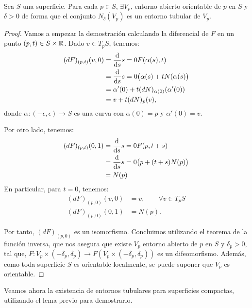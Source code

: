 \begin{lemma}
Sea $S$ una superficie. Para cada $p \in S$, $\exists V_p$, entorno abierto orientable de $p$ en $S$ y $\delta > 0$ de forma que el conjunto $N_\delta(V_p)$ es un entorno tubular de $V_p$.
\end{lemma}
\begin{proof}
Vamos a empezar la demostración calculando la diferencial de $F$ en un punto $(p,t) \in S \times \mathbb{R}$. Dado $v \in T_pS$, tenemos:
%
\begin{align*}
    (dF)_{(p,t)}(v,0) &= \diff{}{s}{s=0} F(\alpha(s), t) \\
    &= \diff{}{s}{s=0} \big( \alpha(s) + tN(\alpha(s) \big) \\ 
    &= \alpha'(0) + t(dN)_{\alpha(0)}(\alpha'(0)) \\ 
    &= v + t(dN)_p(v),
\end{align*}
%
donde $\alpha: (-\epsilon, \epsilon) \longrightarrow S$ es una curva con $\alpha(0) = p$ y $\alpha'(0) = v$. 

Por otro lado, tenemos:
%
\begin{align*}
    (dF)_{(p,t)}(0,1) &= \diff{}{s}{s=0} F(p, t+s) \\ 
    &= \diff{}{s}{s=0} \big( p + (t+s)N(p) \big) \\ &= N(p)
\end{align*}
%
En particular, para $t=0$, tenemos:
%
\begin{align*}
    (dF)_{(p,0)}(v,0) &= v, \qquad \forall v \in T_pS \\
    (dF)_{(p,0)}(0,1) &= N(p).
\end{align*}

Por tanto, $(dF)_{(p,0)}$ es un isomorfismo. Concluimos utilizando el teorema de la función inversa, que nos asegura que existe $V_p$ entorno abierto de $p$ en $S$ y $\delta_p > 0$, tal que, $F: V_p \times (-\delta_p, \delta_p) \longrightarrow F(V_p \times (-\delta_p, \delta_p))$ es un difeomorfismo. Además, como toda superficie $S$ es orientable localmente, se puede suponer que $V_p$ es orientable.
\end{proof}

Veamos ahora la existencia de entornos tubulares para superficies compactas, utilizando el lema previo para demostrarlo.

